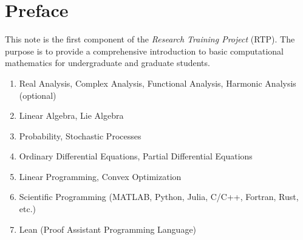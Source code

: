 \chapter*{Preface}

This note is the first component of the \emph{Research Training Project} (RTP).  The purpose is to provide a comprehensive introduction to basic computational mathematics for undergraduate and graduate students. 

\vspace{2cm}

{}

\begin{enumerate}
    \item Real Analysis, Complex Analysis, Functional Analysis, Harmonic Analysis (optional)
    \item Linear Algebra, Lie Algebra 
    \item Probability, Stochastic Processes
    \item Ordinary Differential Equations, Partial Differential Equations 
    \item Linear Programming, Convex Optimization
    \item Scientific Programming (MATLAB, Python, Julia, C/C++, Fortran, Rust, etc.)
    \item Lean (Proof Assistant Programming Language)
\end{enumerate}
